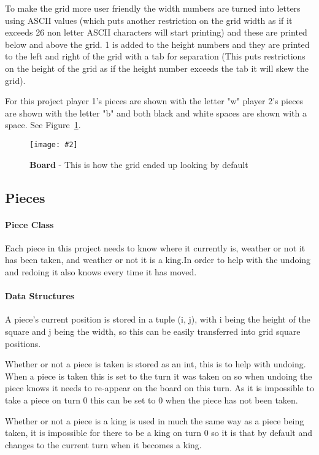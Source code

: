 \documentclass[10pt, a4paper]{article}
\newcommand{\figuremacro}[5]{
    \begin{figure}[#1]
        \centering
        \texttt{[image: \#2]}
        \caption[#3]{\textbf{#3}#4}
        \label{fig:#2}
    \end{figure}
}
\begin{document}
   	To make the grid more user friendly the width numbers are turned into letters using ASCII values (which puts another restriction on the grid width as if it exceeds 26 non letter ASCII characters will start printing) and these are printed below and above the grid. 1 is added to the height numbers and they are printed to the left and right of the grid with a tab for separation (This puts restrictions on the height of the grid as if the height number exceeds the tab it will skew the grid).
   	
   	For this project player 1's pieces are shown with the letter "w" player 2's pieces are shown with the letter "b" and both black and white spaces are shown with a space. See Figure~\ref{fig:grid}.
   	
    
    \figuremacro{h}{grid}{Board}{ - This is how the grid ended up looking by default}{1.0}
    
    \subsection{Pieces}
    \paragraph{Piece Class}
    Each piece in this project needs to know where it currently is, weather or not it has been taken, and weather or not it is a king.In order to help with the undoing and redoing it also knows every time it has moved.
    
    \paragraph{Data Structures}
    A piece's current position is stored in a tuple (i, j), with i being the height of the square and j being the width, so this can be easily transferred into grid square positions.
    
    Whether or not a piece is taken is stored as an int, this is to help with undoing. When a piece is taken this is set to the turn it was taken on so when undoing the piece knows it needs to re-appear on the board on this turn. As it is impossible to take a piece on turn 0 this can be set to 0 when the piece has not been taken.
    
    Whether or not a piece is a king is used in much the same way as a piece being taken, it is impossible for there to be a king on turn 0 so it is that by default and changes to the current turn when it becomes a king.
    
\end{document}
